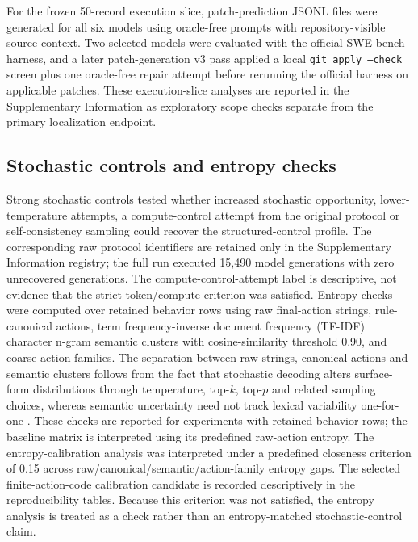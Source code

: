 ﻿\documentclass[preprint,12pt,authoryear]{elsarticle}
\begin{document}
For the frozen 50-record execution slice, patch-prediction JSONL files were generated for all six models using oracle-free prompts with repository-visible source context. Two selected models were evaluated with the official SWE-bench harness, and a later patch-generation v3 pass applied a local \texttt{git apply --check} screen plus one oracle-free repair attempt before rerunning the official harness on applicable patches. These execution-slice analyses are reported in the Supplementary Information as exploratory scope checks separate from the primary localization endpoint.

\subsection{Stochastic controls and entropy checks}

Strong stochastic controls tested whether increased stochastic opportunity, lower-temperature attempts, a compute-control attempt from the original protocol or self-consistency sampling could recover the structured-control profile. The corresponding raw protocol identifiers are retained only in the Supplementary Information registry; the full run executed 15,490 model generations with zero unrecovered generations. The compute-control-attempt label is descriptive, not evidence that the strict token/compute criterion was satisfied. Entropy checks were computed over retained behavior rows using raw final-action strings, rule-canonical actions, term frequency-inverse document frequency (TF-IDF) character n-gram semantic clusters with cosine-similarity threshold 0.90, and coarse action families. The separation between raw strings, canonical actions and semantic clusters follows from the fact that stochastic decoding alters surface-form distributions through temperature, top-\(k\), top-\(p\) and related sampling choices, whereas semantic uncertainty need not track lexical variability one-for-one \citep{fan2018hierarchical,holtzman2020degeneration,kuhn2023semantic}. These checks are reported for experiments with retained behavior rows; the baseline matrix is interpreted using its predefined raw-action entropy. The entropy-calibration analysis was interpreted under a predefined closeness criterion of 0.15 across raw/canonical/semantic/action-family entropy gaps. The selected finite-action-code calibration candidate is recorded descriptively in the reproducibility tables. Because this criterion was not satisfied, the entropy analysis is treated as a check rather than an entropy-matched stochastic-control claim.
\end{document}
